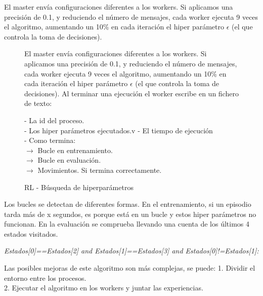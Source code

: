 	El master envía configuraciones diferentes a los workers. Si aplicamos una precisión de 0.1, y reduciendo el número de mensajes, cada worker ejecuta 9 veces el algoritmo, aumentando un 10\% en cada iteración el hiper parámetro $\epsilon$ (el que controla la toma de decisiones). 
	
	\newpage
	
	\begin{figure}
		

		\begin{mdframed}[roundcorner=5pt]
			El master envía configuraciones diferentes a los workers. Si aplicamos una precisión de 0.1, y reduciendo el número de mensajes, cada worker ejecuta 9 veces el algoritmo, aumentando un 10\% en cada iteración el hiper parámetro $\epsilon$ (el que controla la toma de decisiones). Al terminar una ejecución el worker escribe en un fichero de texto: 
			
			
			\begin{tcolorbox}[boxrule=0.5pt, fontupper=\small]			
				- La id del proceso. \\
				- Los hiper parámetros ejecutados.v
				- El tiempo de ejecución \\
				- Como termina:\\
				$\rightarrow$ Bucle en entrenamiento.\\
				$\rightarrow$ Bucle en evaluación.\\
				$\rightarrow$ Movimientos. Si termina correctamente.
					
				
			\end{tcolorbox}
			
		\end{mdframed}
		\caption{RL - Búsqueda de hiperparámetros}
		\label{fig:rl_busqueda}
	\end{figure}
	
	Los bucles se detectan de diferentes formas. En el entrenamiento, si un episodio tarda más de x segundos, es porque está en un bucle y estos hiper parámetros no funcionan. En la evaluación se comprueba llevando una cuenta de los últimos 4 estados visitados. 
	\begin{center}
		\textit{Estados[0]==Estados[2] and Estados[1]==Estados[3] and Estados[0]!=Estados[1]: }
	\end{center}
	
	\begin{flushleft}
		Las posibles mejoras de este algoritmo son más complejas, se puede:	
		1. Dividir el entorno entre los procesos. \\
		2. Ejecutar el algoritmo en los workers y juntar las experiencias.\\
	\end{flushleft}
	

